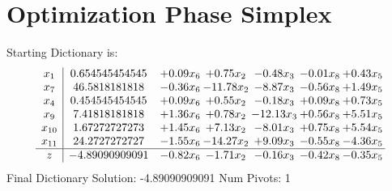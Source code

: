 \documentclass[9pt]{article}
\begin{document}
\section{Optimization Phase Simplex}
Starting Dictionary is:
\[\begin{array}{c| c c@{\hskip 2pt} c@{\hskip 2pt} c@{\hskip 2pt} c@{\hskip 2pt} c@{\hskip 2pt} }
 x_{1}   &  0.654545454545 & +  0.09 x_{6} & +  0.75 x_{2} & -0.48 x_{3} & -0.01 x_{8} & +  0.43 x_{5}\\
 x_{7}   &  46.5818181818 & -0.36 x_{6} & -11.78 x_{2} & -8.87 x_{3} & -0.56 x_{8} & +  1.49 x_{5}\\
 x_{4}   &  0.454545454545 & +  0.09 x_{6} & +  0.55 x_{2} & -0.18 x_{3} & +  0.09 x_{8} & +  0.73 x_{5}\\
 x_{9}   &  7.41818181818 & +  1.36 x_{6} & +  0.78 x_{2} & -12.13 x_{3} & +  0.56 x_{8} & +  5.51 x_{5}\\
 x_{10}   &  1.67272727273 & +  1.45 x_{6} & +  7.13 x_{2} & -8.01 x_{3} & +  0.75 x_{8} & +  5.54 x_{5}\\
 x_{11}   &  24.2727272727 & -1.55 x_{6} & -14.27 x_{2} & +  9.09 x_{3} & -0.55 x_{8} & -4.36 x_{5}\\
\hline
z    &  -4.89090909091 & -0.82 x_{6} & -1.71 x_{2} & -0.16 x_{3} & -0.42 x_{8} & -0.35 x_{5}\\
\end{array}\]
Final Dictionary
Solution:  -4.89090909091
Num Pivots:  1
\end{document}

